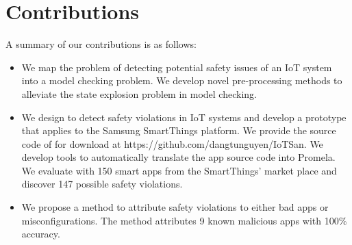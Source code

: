 \section{Contributions}
A summary of our contributions is as follows:
\begin{itemize}
\item We map the problem of {\color{black} detecting potential safety issues of 
an IoT system} into a model checking problem.
  We develop novel pre-processing methods to alleviate the state explosion problem in model checking.

\item We design
  \sys to detect safety violations in IoT systems and
  develop a prototype that applies to the Samsung SmartThings platform. {\color{black} We provide the source code of \sys for download at https://github.com/dangtunguyen/IoTSan}.
  We develop tools to automatically translate the app source code into Promela.
  We evaluate \sys with 150 smart apps from the SmartThings' market place
  and discover 147 possible safety violations.

\item We propose a method to attribute safety violations to either bad apps or misconfigurations.
  The method attributes 9 known malicious apps with 100\% accuracy.
\end{itemize}

